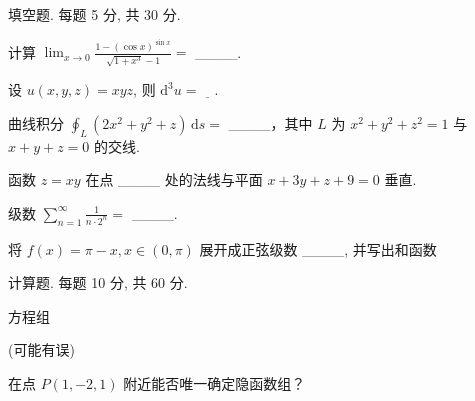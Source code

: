 \par{}
填空题. 每题 5 分, 共 30 分.\par
计算 $\lim_{x\to 0}\frac{1 - (\cos x)^{\sin x}}{\sqrt{1 + x^3} - 1} =$ \_\_\_\_.\par
设 $u(x, y, z) = xyz$, 则 $\mathrm{d}^3 u = \underline{\quad}$.\par
曲线积分 $\oint_{L} (2x^{2} + y^{2} + z) \, \mathrm{d}s =$ \_\_\_\_，其中 $L$ 为 $x^{2} + y^{2} + z^{2} = 1$ 与 $x + y + z = 0$ 的交线.\par
函数 $z = xy$ 在点 \_\_\_\_ 处的法线与平面 $x + 3y + z + 9 = 0$ 垂直.\par
级数 $\sum_{n=1}^{\infty} \frac{1}{n \cdot 2^n} =$ \_\_\_\_.\par
将 $f(x) = \pi - x, x \in (0, \pi)$ 展开成正弦级数 \_\_\_\_, 并写出和函数\par
\par{}
计算题. 每题 10 分, 共 60 分.\par
\par{}
方程组\par
\nopagebreak[4]
(可能有误)\par
在点 $P(1, -2, 1)$ 附近能否唯一确定隐函数组？\par
\par{}
